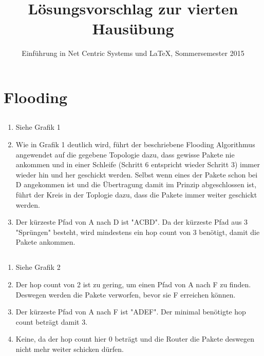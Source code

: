 \documentclass[a4paper,
			llpt,
			solution,
			accentcolor=tud2d,
			colorbacktitle
			]
			{tudexercise}
\title{Lösungsvorschlag zur vierten Hausübung}
\subtitle{Einführung in Net Centric Systems und \LaTeX, Sommersemester 2015}
\newcommand{\8}{$\infty$}
\begin{document}
\maketitle
\section{Flooding}
\subsection{}
\begin{enumerate}
\item Siehe Grafik 1
\item Wie in Grafik 1 deutlich wird, führt der beschriebene Flooding Algorithmus angewendet auf die gegebene Topologie dazu, dass gewisse Pakete nie ankommen und in einer Schleife (Schritt 6 entspricht wieder Schritt 3) immer wieder hin und her geschickt werden. Selbst wenn eines der Pakete schon bei D angekommen ist und die Übertragung damit im Prinzip abgeschlossen ist, führt der Kreis in der Toplogie dazu, dass die Pakete immer weiter geschickt werden.
\item Der kürzeste Pfad von A nach D ist "ACBD". Da der kürzeste Pfad aus 3 "Sprüngen" besteht, wird mindestens ein hop count von 3 benötigt, damit die Pakete ankommen.
\end{enumerate}
\subsection{}
\begin{enumerate}

\item Siehe Grafik 2
\item Der hop count von 2 ist zu gering, um einen Pfad von A nach F zu finden. Deswegen werden die Pakete verworfen, bevor sie F erreichen können.
\item Der kürzeste Pfad von A nach F ist "ADEF". Der minimal benötigte hop count beträgt damit 3.
\item Keine, da der hop count hier 0 beträgt und die Router die Pakete deswegen nicht mehr weiter schicken dürfen.

\end{enumerate}
\end{document}
